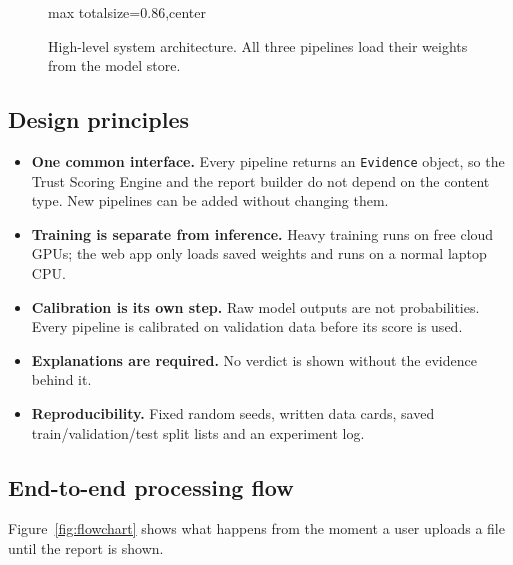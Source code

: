 \documentclass[11pt,a4paper]{article}
\newenvironment{diagram}{\begin{adjustbox}{max totalsize={\linewidth}{0.86\textheight},center}}{\end{adjustbox}}
\begin{document}
\begin{figure}[htbp]
\begin{diagram}
\end{diagram}
\caption{High-level system architecture. All three pipelines load their weights from the model store.}
\label{fig:architecture}
\end{figure}

\subsection{Design principles}
\begin{itemize}
  \item \textbf{One common interface.} Every pipeline returns an \texttt{Evidence} object, so the
        Trust Scoring Engine and the report builder do not depend on the content type. New
        pipelines can be added without changing them.
  \item \textbf{Training is separate from inference.} Heavy training runs on free cloud GPUs; the
        web app only loads saved weights and runs on a normal laptop CPU.
  \item \textbf{Calibration is its own step.} Raw model outputs are not probabilities. Every
        pipeline is calibrated on validation data before its score is used.
  \item \textbf{Explanations are required.} No verdict is shown without the evidence behind it.
  \item \textbf{Reproducibility.} Fixed random seeds, written data cards, saved train/validation/test
        split lists and an experiment log.
\end{itemize}

\subsection{End-to-end processing flow}
Figure~\ref{fig:flowchart} shows what happens from the moment a user uploads a file until the
report is shown.
\end{document}
